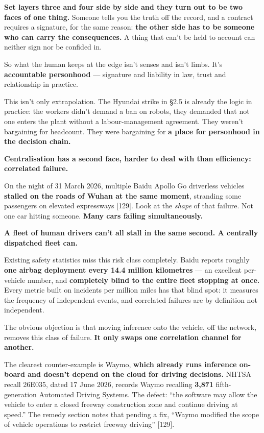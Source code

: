 \documentclass[11pt,a4paper]{article}
\begin{document}
\textbf{Set layers three and four side by side and they turn out to be two faces of one thing.} Someone tells you the truth off the record, and a contract requires a signature, for the same reason: \textbf{the other side has to be someone who can carry the consequences.} A thing that can't be held to account can neither sign nor be confided in.

So what the human keeps at the edge isn't senses and isn't limbs. It's \textbf{accountable personhood} --- signature and liability in law, trust and relationship in practice.

This isn't only extrapolation. The Hyundai strike in \S{}2.5 is already the logic in practice: the workers didn't demand a ban on robots, they demanded that not one enters the plant without a labour-management agreement. They weren't bargaining for headcount. They were bargaining for \textbf{a place for personhood in the decision chain.}

\textbf{Centralisation has a second face, harder to deal with than efficiency: correlated failure.}

On the night of 31 March 2026, multiple Baidu Apollo Go driverless vehicles \textbf{stalled on the roads of Wuhan at the same moment}, stranding some passengers on elevated expressways [129]. Look at the \textit{shape} of that failure. Not one car hitting someone. \textbf{Many cars failing simultaneously.}

\textbf{A fleet of human drivers can't all stall in the same second. A centrally dispatched fleet can.}

Existing safety statistics miss this risk class completely. Baidu reports roughly \textbf{one airbag deployment every 14.4 million kilometres} --- an excellent per-vehicle number, and \textbf{completely blind to the entire fleet stopping at once.} Every metric built on incidents per million miles has that blind spot: it measures the frequency of independent events, and correlated failures are by definition not independent.

The obvious objection is that moving inference onto the vehicle, off the network, removes this class of failure. \textbf{It only swaps one correlation channel for another.}

The clearest counter-example is Waymo, \textbf{which already runs inference on-board and doesn't depend on the cloud for driving decisions.} NHTSA recall 26E035, dated 17 June 2026, records Waymo recalling \textbf{3,871} fifth-generation Automated Driving Systems. The defect: ``the software may allow the vehicle to enter a closed freeway construction zone and continue driving at speed.'' The remedy section notes that pending a fix, ``Waymo modified the scope of vehicle operations to restrict freeway driving'' [129].
\end{document}
